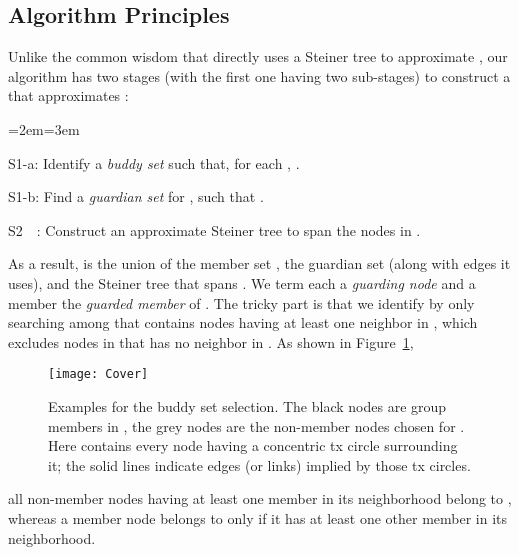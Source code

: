 \documentclass[10pt, conference, compsocconf]{IEEEtran}
\begin{document}
  \subsection{Algorithm Principles} \label{sec:principle}
Unlike the common wisdom that directly uses a Steiner tree to approximate , our algorithm has two stages (with the first one having two sub-stages) to construct a  that approximates :
\begin{list}{}{\itemindent=-1.5em}{\listparindent=2em}{=3em}\item[S1-a:] Identify a \textit{buddy set}  such that, for each , .
\item[S1-b:] Find a \textit{guardian set}  for , such that .
\item[S2~~:] Construct an approximate Steiner tree  to span the nodes in .
\end{list}
As a result,  is the union of the member set , the guardian set  (along with edges it uses), and the Steiner tree that spans . We term each  a \textit{guarding node} and a member  the \textit{guarded member} of . The tricky part is that we identify  by only searching among  that contains nodes having at least one neighbor in , which excludes nodes in  that has no neighbor in . As shown in Figure~\ref{fig:cover},
\begin{figure}[htbp]
      \centerline{\texttt{[image: Cover]}}
      \caption{Examples for the buddy set selection. The black nodes are group members in , the grey nodes are the non-member nodes chosen for . Here  contains every node having a concentric tx circle surrounding it; the solid lines indicate edges (or links) implied by those tx circles.}
      \label{fig:cover}
    \end{figure}
all non-member nodes having at least one member in its neighborhood belong to , whereas a member node belongs to  only if it has at least one other member in its neighborhood.
\end{document}
